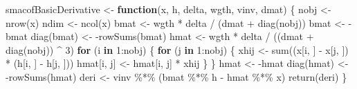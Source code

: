 \documentclass[
  12pt,
  letterpaper,
  DIV=11,
  numbers=noendperiod]{scrartcl}
\newenvironment{Shaded}{\begin{snugshade}}{\end{snugshade}}
\newcommand{\ControlFlowTok}[1]{\textcolor[rgb]{0.00,0.23,0.31}{\textbf{#1}}}
\newcommand{\DecValTok}[1]{\textcolor[rgb]{0.68,0.00,0.00}{#1}}
\newcommand{\FunctionTok}[1]{\textcolor[rgb]{0.28,0.35,0.67}{#1}}
\newcommand{\NormalTok}[1]{\textcolor[rgb]{0.00,0.23,0.31}{#1}}
\newcommand{\OtherTok}[1]{\textcolor[rgb]{0.00,0.23,0.31}{#1}}
\newcommand{\SpecialCharTok}[1]{\textcolor[rgb]{0.37,0.37,0.37}{#1}}
\begin{document}
\begin{Shaded}
\begin{Highlighting}[]
\NormalTok{smacofBasicDerivative }\OtherTok{\textless{}{-}} \ControlFlowTok{function}\NormalTok{(x, h, delta, wgth, vinv, dmat) \{}
\NormalTok{  nobj }\OtherTok{\textless{}{-}} \FunctionTok{nrow}\NormalTok{(x)}
\NormalTok{  ndim }\OtherTok{\textless{}{-}} \FunctionTok{ncol}\NormalTok{(x)}
\NormalTok{  bmat }\OtherTok{\textless{}{-}}\NormalTok{ wgth }\SpecialCharTok{*}\NormalTok{ delta }\SpecialCharTok{/}\NormalTok{ (dmat }\SpecialCharTok{+} \FunctionTok{diag}\NormalTok{(nobj))}
\NormalTok{  bmat }\OtherTok{\textless{}{-}} \SpecialCharTok{{-}}\NormalTok{bmat}
  \FunctionTok{diag}\NormalTok{(bmat) }\OtherTok{\textless{}{-}} \SpecialCharTok{{-}}\FunctionTok{rowSums}\NormalTok{(bmat)}
\NormalTok{  hmat }\OtherTok{\textless{}{-}}\NormalTok{ wgth }\SpecialCharTok{*}\NormalTok{ delta }\SpecialCharTok{/}\NormalTok{ ((dmat }\SpecialCharTok{+} \FunctionTok{diag}\NormalTok{(nobj)) }\SpecialCharTok{\^{}} \DecValTok{3}\NormalTok{)}
  \ControlFlowTok{for}\NormalTok{ (i }\ControlFlowTok{in} \DecValTok{1}\SpecialCharTok{:}\NormalTok{nobj) \{}
    \ControlFlowTok{for}\NormalTok{ (j }\ControlFlowTok{in} \DecValTok{1}\SpecialCharTok{:}\NormalTok{nobj) \{}
\NormalTok{      xhij }\OtherTok{\textless{}{-}} \FunctionTok{sum}\NormalTok{((x[i, ] }\SpecialCharTok{{-}}\NormalTok{ x[j, ]) }\SpecialCharTok{*}\NormalTok{ (h[i, ] }\SpecialCharTok{{-}}\NormalTok{ h[j, ]))}
\NormalTok{      hmat[i, j] }\OtherTok{\textless{}{-}}\NormalTok{ hmat[i, j] }\SpecialCharTok{*}\NormalTok{ xhij}
\NormalTok{    \}}
\NormalTok{  \}}
\NormalTok{  hmat }\OtherTok{\textless{}{-}} \SpecialCharTok{{-}}\NormalTok{hmat}
  \FunctionTok{diag}\NormalTok{(hmat) }\OtherTok{\textless{}{-}} \SpecialCharTok{{-}}\FunctionTok{rowSums}\NormalTok{(hmat)}
\NormalTok{  deri }\OtherTok{\textless{}{-}}\NormalTok{ vinv }\SpecialCharTok{\%*\%}\NormalTok{ (bmat }\SpecialCharTok{\%*\%}\NormalTok{ h }\SpecialCharTok{{-}}\NormalTok{ hmat }\SpecialCharTok{\%*\%}\NormalTok{ x)}
  \FunctionTok{return}\NormalTok{(deri)}
\NormalTok{\}}


\end{Highlighting}
\end{Shaded}
\end{document}
